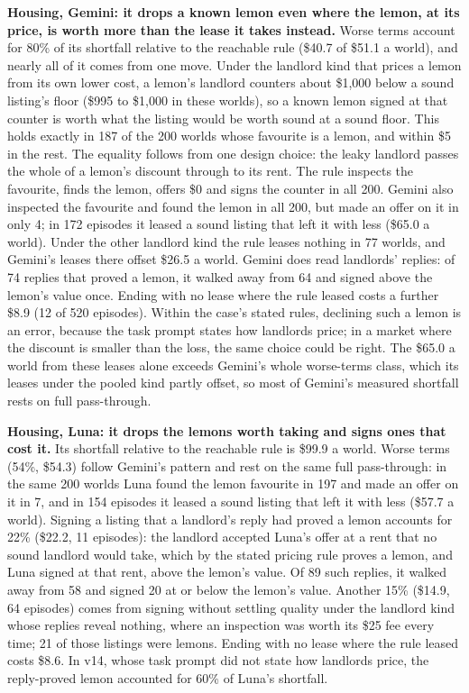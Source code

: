 \textbf{Housing, Gemini: it drops a known lemon even where the lemon, at its price, is worth more than the lease it takes
instead.} Worse terms account for 80\% of
its shortfall relative to the reachable rule (\$40.7 of \$51.1 a world), and nearly all of it comes from one move. Under
the landlord kind that prices a lemon from its own lower cost, a lemon's landlord counters about \$1,000 below a sound
listing's floor (\$995 to \$1,000 in these worlds), so a known lemon signed at that counter is worth what the listing
would be worth sound at a sound floor. This holds exactly in 187 of the 200 worlds whose favourite is a lemon, and
within \$5 in the rest. The equality follows from one design choice: the leaky landlord passes the whole of a lemon's
discount through to its rent. The rule inspects the favourite, finds the lemon, offers \$0 and signs the counter in all 200.
Gemini also inspected the favourite and found the lemon in all 200, but made an offer on it in only 4; in 172 episodes
it leased a sound listing that left it with less (\$65.0 a world). Under the other landlord kind the rule leases nothing
in 77 worlds, and Gemini's leases there offset \$26.5 a world. Gemini does read landlords' replies: of 74 replies that
proved a lemon, it walked away from 64 and signed above the lemon's value once. Ending with no lease where the rule
leased costs a further \$8.9 (12 of 520 episodes). Within the case's stated rules, declining such a lemon is an error, because
the task prompt states how landlords price; in a market where the discount is smaller than the loss, the same choice
could be right. The \$65.0 a world from these leases alone exceeds Gemini's whole worse-terms class, which its leases
under the pooled kind partly offset, so most of Gemini's measured shortfall rests on full pass-through.

\textbf{Housing, Luna: it drops the lemons worth taking and signs ones that cost it.} Its shortfall relative to the
reachable rule is \$99.9 a world. Worse terms (54\%, \$54.3) follow Gemini's pattern and rest on the same full pass-through: in the same 200 worlds Luna found
the lemon favourite in 197 and made an offer on it in 7, and in 154 episodes it leased a sound listing that left it
with less (\$57.7 a world). Signing a listing that a landlord's reply had proved a lemon accounts for 22\% (\$22.2,
11 episodes): the landlord accepted Luna's offer at a rent that no sound landlord would take, which by the stated
pricing rule proves a lemon, and Luna signed at that rent, above the lemon's value. Of 89 such replies, it walked away
from 58 and signed 20 at or below the lemon's value. Another 15\% (\$14.9, 64 episodes) comes from signing without
settling quality under the landlord kind whose replies reveal nothing, where an inspection was worth its \$25 fee every
time; 21 of those listings were lemons. Ending with no lease where the rule leased costs \$8.6. In v14, whose task
prompt did not state how landlords price, the reply-proved lemon accounted for 60\% of Luna's shortfall.

